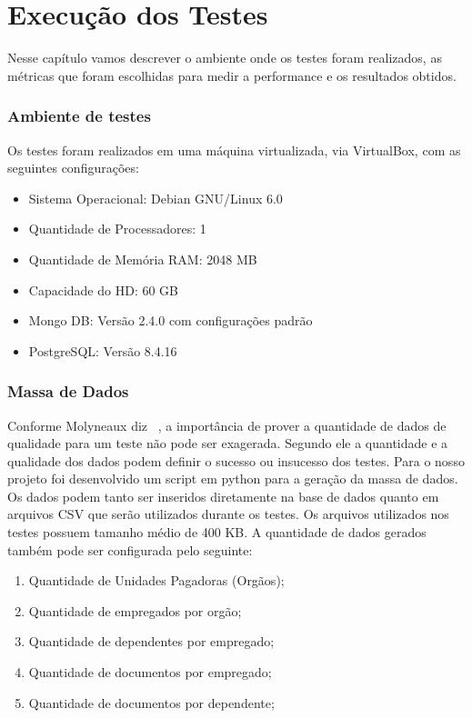 \chapter {Execução dos Testes}

Nesse capítulo vamos descrever o ambiente onde os testes foram realizados, as métricas que foram escolhidas para medir a performance e os resultados obtidos.

\subsection{Ambiente de testes}

Os testes foram realizados em uma máquina virtualizada, via VirtualBox, com as seguintes configurações:

\begin{itemize}
\item Sistema Operacional: Debian GNU/Linux 6.0
\item Quantidade de Processadores: 1 
\item Quantidade de Memória RAM: 2048 MB
\item Capacidade do HD: 60 GB
\item Mongo DB: Versão 2.4.0 com configurações padrão
\item PostgreSQL: Versão 8.4.16
\end{itemize}

\subsection{Massa de Dados}

Conforme Molyneaux diz ~\cite{theartoftestperf}, a importância de prover a quantidade de dados de qualidade para um teste não pode ser exagerada. Segundo ele a quantidade e a qualidade dos dados podem definir o sucesso ou insucesso dos testes. Para o nosso projeto foi desenvolvido um script em python para a geração da massa de dados. Os dados podem tanto ser inseridos diretamente na base de dados quanto em arquivos CSV que serão utilizados durante os testes. Os arquivos utilizados nos testes possuem tamanho médio de 400 KB. A quantidade de dados gerados também pode ser configurada pelo seguinte:

\begin{enumerate}
	\item Quantidade de Unidades Pagadoras (Orgãos);
	\item Quantidade de empregados por orgão;
	\item Quantidade de dependentes por empregado;
	\item Quantidade de documentos por empregado;
	\item Quantidade de documentos por dependente;
\end{enumerate}

